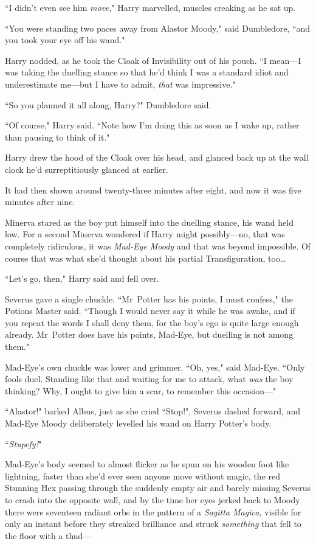 ``I didn't even see him \emph{move}," Harry marvelled, muscles creaking as he sat up.

``You were standing two paces away from Alastor Moody," said Dumbledore, ``and you took your eye off his wand."

Harry nodded, as he took the Cloak of Invisibility out of his pouch. ``I mean—I was taking the duelling stance so that he'd think I was a standard idiot and underestimate me—but I have to admit, \emph{that} was impressive."

``So you planned it all along, Harry?" Dumbledore said.

``Of course," Harry said. ``Note how I'm doing this as soon as I wake up, rather than pausing to think of it."

Harry drew the hood of the Cloak over his head, and glanced back up at the wall clock he'd surreptitiously glanced at earlier.

It had then shown around twenty-three minutes after eight, and now it was five minutes after nine.

\later

Minerva stared as the boy put himself into the duelling stance, his wand held low. For a second Minerva wondered if Harry might possibly—no, that was completely ridiculous, it was \emph{Mad-Eye Moody} and that was beyond impossible. Of course that was what she'd thought about his partial Transfiguration, too{\ldots}

``Let's go, then," Harry said and fell over.

Severus gave a single chuckle. ``Mr~Potter has his points, I must confess," the Potions Master said. ``Though I would never say it while he was awake, and if you repeat the words I shall deny them, for the boy's ego is quite large enough already. Mr~Potter does have his points, Mad-Eye, but duelling is not among them."

Mad-Eye's own chuckle was lower and grimmer. ``Oh, yes," said Mad-Eye. ``Only fools duel. Standing like that and waiting for me to attack, what \emph{was} the boy thinking? Why, I ought to give him a scar, to remember this occasion—"

``Alastor!" barked Albus, just as she cried ``Stop!", Severus dashed forward, and Mad-Eye Moody deliberately levelled his wand on Harry Potter's body.

``\emph{Stupefy!}"

Mad-Eye's body seemed to almost flicker as he spun on his wooden foot like lightning, faster than she'd ever seen anyone move without magic, the red Stunning Hex passing through the suddenly empty air and barely missing Severus to crash into the opposite wall, and by the time her eyes jerked back to Moody there were seventeen radiant orbs in the pattern of a \emph{Sagitta Magica,} visible for only an instant before they streaked brilliance and struck \emph{something} that fell to the floor with a thud—

